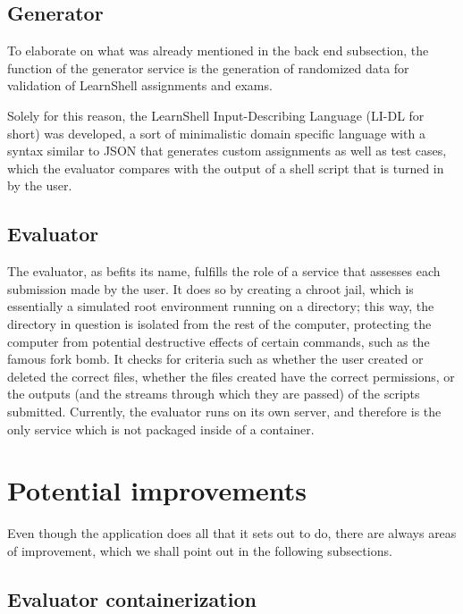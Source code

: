 \documentclass[thesis=B,english]{FITthesis}[2019/12/23]
\begin{document}
\subsection{Generator}

To elaborate on what was already mentioned in the back end subsection, the function of the generator service is the generation of randomized data for validation of LearnShell assignments and exams. 

Solely for this reason, the LearnShell Input-Describing Language (LI-DL for short) was developed, a sort of minimalistic domain specific language with a syntax similar to JSON that generates custom assignments as well as test cases, which the evaluator compares with the output of a shell script that is turned in by the user. \cite{learnshell-jilek}  
 
\subsection{Evaluator}

The evaluator, as befits its name, fulfills the role of a service that assesses each submission made by the user. It does so by creating a chroot jail, which is essentially a simulated root environment running on a directory; this way, the directory in question is isolated from the rest of the computer, protecting the computer from potential destructive effects of certain commands, such as the famous fork bomb. \cite{unix-handbook} It checks for criteria such as whether the user created or deleted the correct files, whether the files created have the correct permissions, or the outputs (and the streams through which they are passed) of the scripts submitted.
\newline
Currently, the evaluator runs on its own server, and therefore is the only service which is not packaged inside of a container.

\section{Potential improvements}

Even though the application does all that it sets out to do, there are always areas of improvement, which we shall point out in the following subsections.

\subsection{Evaluator containerization}
\end{document}
